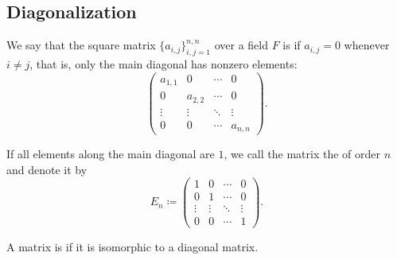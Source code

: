 \subsection{Diagonalization}\label{subsec:diagonalization}

\begin{definition}\label{def:diagonal_matrix}
  We say that the square matrix \( \{ a_{i,j} \}_{i,j=1}^{n,n} \) over a field \( F \) is  if \( a_{i,j} = 0 \) whenever \( i \neq j \), that is, only the main diagonal has nonzero elements:
  \begin{equation*}
    \begin{pmatrix}
      a_{1,1} & 0       & \cdots & 0 \\
      0       & a_{2,2} & \cdots & 0 \\
      \vdots  & \vdots  & \ddots & \vdots \\
      0       & 0       & \cdots & a_{n,n}
    \end{pmatrix}.
  \end{equation*}

  If all elements along the main diagonal are \( 1 \), we call the matrix the  of order \( n \) and denote it by
  \begin{equation*}
    E_n \coloneqq
    \begin{pmatrix}
      1       & 0       & \cdots & 0 \\
      0       & 1       & \cdots & 0 \\
      \vdots  & \vdots  & \ddots & \vdots \\
      0       & 0       & \cdots & 1
    \end{pmatrix}.
  \end{equation*}
\end{definition}

\begin{definition}\label{def:diagonalizable_matrix}
  A matrix is  if it is isomorphic to a diagonal matrix.
\end{definition}
